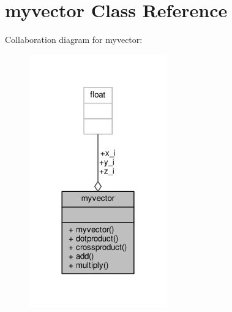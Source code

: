 \hypertarget{classmyvector}{}\section{myvector Class Reference}
\label{classmyvector}


Collaboration diagram for myvector\+:\nopagebreak
\begin{figure}[H]
\begin{center}
\leavevmode
\includegraphics[width=168pt]{classmyvector__coll__graph}
\end{center}
\end{figure}
